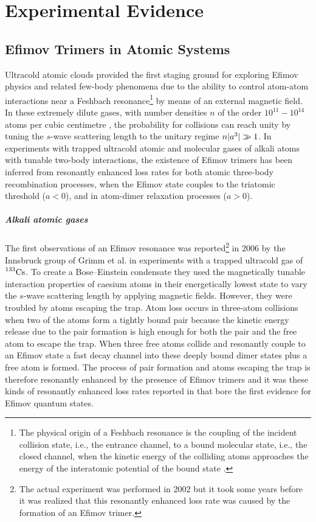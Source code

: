 \chapter{Experimental Evidence}\label{chap:2}
\section{Efimov Trimers in Atomic Systems}
Ultracold atomic clouds provided the first staging ground for exploring Efimov physics and related few-body phenomena due to the ability to control atom-atom interactions near a Feshbach resonance\footnote{The physical origin of a Feshbach resonance is the coupling of the incident collision state, i.e., the entrance channel, to a bound molecular state, i.e., the closed channel, when the kinetic energy of the colliding atoms approaches the energy of the interatomic potential of the bound state \cite{Feshbach}.} by means of an external magnetic field. In these extremely dilute gases, with number densities $n$ of the order $10^{11}-10^{14}$ atoms per cubic centimetre \cite{virulh2008condensed}, the probability for collisions can reach unity by tuning the $s$-wave scattering length to the unitary regime $n\lvert a^3\rvert\gg1$. In experiments with trapped ultracold atomic and molecular gases of alkali atoms with tunable two-body interactions, the existence of Efimov trimers has been inferred from resonantly enhanced loss rates for both atomic three-body recombination processes, when the Efimov state couples to the triatomic threshold ($a<0$), and in atom-dimer relaxation processes ($a>0$). 
\paragraph{Alkali atomic gases}\label{par:alkali}
The first observations of an Efimov resonance was reported\footnote{The actual experiment was performed in 2002 but it took some years before it was realized that this resonantly enhanced loss rate was caused by the formation of an Efimov trimer.} in 2006 by the Innsbruck group of Grimm et al. in experiments with a trapped ultracold gas of $\prescript{133}{}{\mathrm{Cs}}$. To create a Bose--Einstein condensate they used the magnetically tunable interaction properties of caesium atoms in their energetically lowest state to vary the $s$-wave scattering length by applying magnetic fields. However, they were troubled by atoms escaping the trap. Atom loss occurs in three-atom collisions when two of the atoms form a tightly bound pair because the kinetic energy release due to the pair formation is high enough for both the pair and the free atom to escape the trap. When three free atoms collide and resonantly couple to an Efimov state a fast decay channel into these deeply bound dimer states plus a free atom is formed. The process of pair formation and atoms escaping the trap is therefore resonantly enhanced by the presence of Efimov trimers and it was these kinds of resonantly enhanced loss rates reported in \cite{Grimm:2006} that bore the first evidence for Efimov quantum states.


